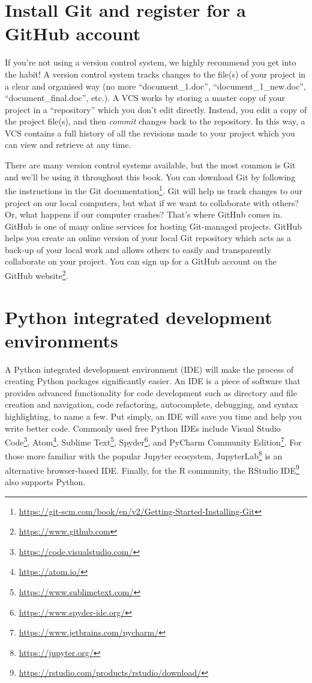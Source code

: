 \documentclass[
]{krantz}
\renewcommand{\href}[2]{#2\footnote{\url{#1}}}
\begin{document}
\hypertarget{install-git-and-register-for-a-github-account}{%
\section{Install Git and register for a GitHub account}\label{install-git-and-register-for-a-github-account}}

If you're not using a version control system, we highly recommend you get into the habit! A version control system tracks changes to the file(s) of your project in a clear and organised way (no more ``document\_1.doc'', ``document\_1\_new.doc'', ``document\_final.doc'', etc.). A VCS works by storing a master copy of your project in a ``repository'' which you don't edit directly. Instead, you edit a copy of the project file(s), and then \emph{commit} changes back to the repository. In this way, a VCS contains a full history of all the revisions made to your project which you can view and retrieve at any time.

There are many version control systems available, but the most common is Git and we'll be using it throughout this book. You can download Git by following the instructions in the \href{https://git-scm.com/book/en/v2/Getting-Started-Installing-Git}{Git documentation}. Git will help us track changes to our project on our local computers, but what if we want to collaborate with others? Or, what happens if our computer crashes? That's where GitHub comes in. GitHub is one of many online services for hosting Git-managed projects. GitHub helps you create an online version of your local Git repository which acts as a back-up of your local work and allows others to easily and transparently collaborate on your project. You can sign up for a GitHub account on the \href{https://www.github.com}{GitHub website}.

\hypertarget{python-integrated-development-environments}{%
\section{Python integrated development environments}\label{python-integrated-development-environments}}

A Python integrated development environment (IDE) will make the process of creating Python packages significantly easier. An IDE is a piece of software that provides advanced functionality for code development such as directory and file creation and navigation, code refactoring, autocomplete, debugging, and syntax highlighting, to name a few. Put simply, an IDE will save you time and help you write better code. Commonly used free Python IDEs include \href{https://code.visualstudio.com/}{Visual Studio Code}, \href{https://atom.io/}{Atom}, \href{https://www.sublimetext.com/}{Sublime Text}, \href{https://www.spyder-ide.org/}{Spyder}, and \href{https://www.jetbrains.com/pycharm/}{PyCharm Community Edition}. For those more familiar with the popular Jupyter ecosystem, \href{https://jupyter.org/}{JupyterLab} is an alternative browser-based IDE. Finally, for the R community, the \href{https://rstudio.com/products/rstudio/download/}{RStudio IDE} also supports Python.
\end{document}
